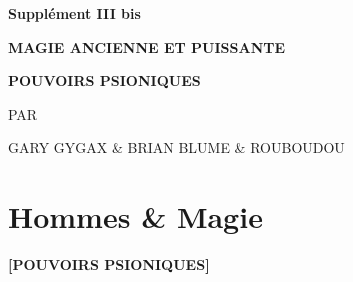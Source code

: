 \newpage
{}\begin{center}
{\Huge {}}{\normalsize \textsuperscript{\sffamily\textregistered}}

\vspace{1.8cm}

{\Large \textbf{Supplément III bis}}

\vspace{1.3cm}

{\Huge {}}

\vspace{0.3cm}

{\Huge {}}

\vspace{2.0cm}

{\Large \textbf{MAGIE ANCIENNE ET PUISSANTE}}

\vspace{0.5cm}

{\Large \textbf{POUVOIRS PSIONIQUES}}

\vspace{1cm}

{\large PAR

\vspace{0.1cm}

GARY GYGAX \& BRIAN BLUME \& ROUBOUDOU}
\end{center}

\newpage
\section*{Hommes \& Magie}

\begin{center}
\textbf{[POUVOIRS PSIONIQUES]}
\end{center}

